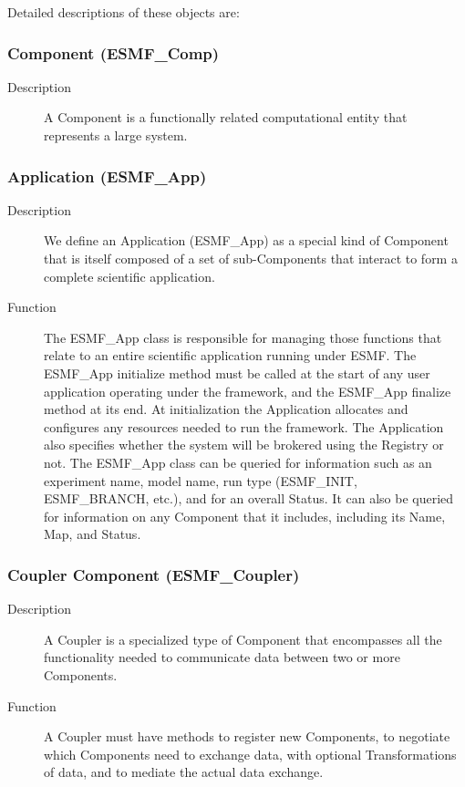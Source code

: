 Detailed descriptions of these objects are:

\subsubsection{Component (ESMF\_Comp)} 
\begin{description}
\item [Description] A Component is a functionally related computational entity that represents 
a large system.  
\end{description}

\subsubsection{Application (ESMF\_App)}
\begin{description} 
\item [Description] We define an Application (ESMF\_App) as a special kind of Component 
that is itself composed of a set of sub-Components that interact to form a complete scientific
application.  
\item [Function] The ESMF\_App class is responsible for managing those functions that relate 
to an entire scientific application running under ESMF.  The ESMF\_App initialize method 
must be called at the start of any user application operating under the framework, and
the ESMF\_App finalize method at its end.  At initialization the Application allocates and 
configures any resources needed to run the framework.  The Application also specifies whether 
the system will be brokered using the Registry or not.  The ESMF\_App class can be queried 
for information such as an experiment name, model name, run type (ESMF\_INIT, 
ESMF\_BRANCH, etc.), and for an overall Status.  It can also be queried for
information on any Component that it includes, including its Name, Map, and
Status.
\end{description}

\subsubsection{Coupler Component (ESMF\_Coupler)}
\begin{description}
\item [Description] A Coupler is a specialized type of Component that encompasses all the 
functionality needed to communicate data between two or more Components. 
\item [Function] A Coupler must have methods to register new Components, to negotiate
which Components need to exchange data, with optional Transformations of data, and to
mediate the actual data exchange.
\end{description}

